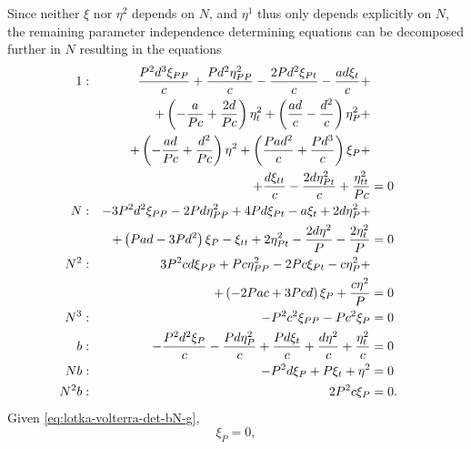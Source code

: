 Since neither \(\xi\) nor \(\eta^2\) depends on \(N\), and \(\eta^1\) thus only depends explicitly on \(N\), the remaining parameter independence determining equations  can be decomposed further in \(N\) resulting in the equations
\begin{subequations}
  \begin{flalign}
    1 & : & \frac{P^{2} d^{3} \xi_{PP}}{c} + \frac{P d^{2} \eta^2_{PP}}{c} - \frac{2 P d^{2} \xi_{Pt}}{c} - \frac{a d \xi_{t}}{c} +&&&\\&&+ \left(- \frac{a}{P c} + \frac{2 d}{P c}\right) \eta^2_{t} + \left(\frac{a d}{c} - \frac{d^{2}}{c}\right) \eta^2_{P} +&&&\\&&+ \left(- \frac{a d}{P c} + \frac{d^{2}}{P c}\right) \eta^{2} + \left(\frac{P a d^{2}}{c} + \frac{P d^{3}}{c}\right) \xi_{P} +&&&\\&&+ \frac{d \xi_{tt}}{c} - \frac{2 d \eta^2_{Pt}}{c} + \frac{\eta^2_{tt}}{P c} &= 0 && \FlLabel{eq:lotka-volterra-det-bN-a}\\
    N & : & - 3 P^{2} d^{2} \xi_{PP} - 2 P d \eta^2_{PP} + 4 P d \xi_{Pt} - a \xi_{t} + 2 d \eta^2_{P} +&&&\\&&+ \left(P a d - 3 P d^{2}\right) \xi_{P} - \xi_{tt} + 2 \eta^2_{Pt} - \frac{2 d \eta^{2}}{P} - \frac{2 \eta^2_{t}}{P} &= 0 && \FlLabel{eq:lotka-volterra-det-bN-b}\\
    N^{2} & : & 3 P^{2} c d \xi_{PP} + P c \eta^2_{PP} - 2 P c \xi_{Pt} - c \eta^2_{P} +&&&\\&&+ \left(- 2 P a c + 3 P c d\right) \xi_{P} + \frac{c \eta^{2}}{P} &= 0 && \FlLabel{eq:lotka-volterra-det-bN-c}\\
    N^{3} & : & - P^{2} c^{2} \xi_{PP} - P c^{2} \xi_{P} &= 0 && \FlLabel{eq:lotka-volterra-det-bN-d}\\
    b & : & - \frac{P^{2} d^{2} \xi_{P}}{c} - \frac{P d \eta^2_{P}}{c} + \frac{P d \xi_{t}}{c} + \frac{d \eta^{2}}{c} + \frac{\eta^2_{t}}{c} &= 0 && \FlLabel{eq:lotka-volterra-det-bN-e}\\
    N b & : & - P^{2} d \xi_{P} + P \xi_{t} + \eta^{2} &= 0 && \FlLabel{eq:lotka-volterra-det-bN-f}\\
    N^{2} b & : & 2 P^{2} c \xi_{P} &= 0. && \FlLabel{eq:lotka-volterra-det-bN-g}
  \end{flalign}
\end{subequations}
Given \cref{eq:lotka-volterra-det-bN-g},
\begin{equation}
  \xi_{P} = 0,
\end{equation}
